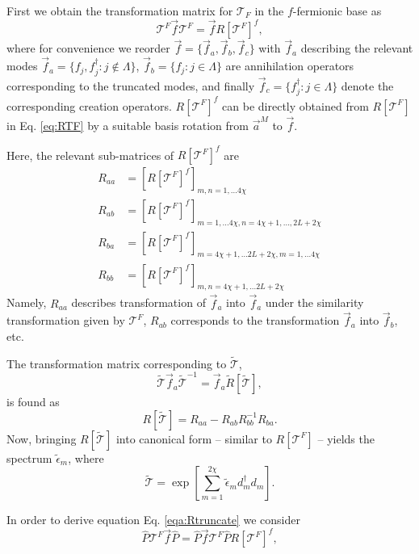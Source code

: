 \documentclass[prl,twocolumn,showpacs,floatfix,superscriptaddress,nofootinbib]{revtex4-1}
\newcommand{\Br}[1]{\left[#1\right]}
\begin{document}
First we obtain the transformation matrix for $\mathcal{T}_F$ in the $f$-fermionic base as
\begin{equation*}
\mathcal{T}^F \vec f \mathcal{T}^F = \vec f R[\mathcal{T}^F]^f,
\end{equation*} 
where for convenience we reorder  
$\vec f =\{\vec f_a, \vec f_b, \vec f_c \} $ with $\vec f_a$ describing the relevant modes $\vec f_a = \{f_j, f_j^\dagger : j \notin \Lambda \}$, $\vec f_b = \{f_j : j \in \Lambda\}$  are annihilation operators corresponding to the truncated modes, and finally  $\vec f_c = \{f_j^\dagger : j \in \Lambda\}$ denote the corresponding creation operators. $R[\mathcal{T}^F]^f$ can be directly obtained from $R[\mathcal{T}^F]$ in Eq. \eqref{eq:RTF} by a suitable basis rotation from $\vec a^M$ to $\vec f$. 

\noindent Here, the relevant sub-matrices of $R[\mathcal{T}^F]^f$ are 
\begin {align*}
R_{aa} &= \Br{R[\mathcal{T}^F]^f}_{m,n = 1,\dotsc 4 \chi} \\
R_{ab} &= \Br{R[\mathcal{T}^F]^f}_{m = 1,\dotsc 4 \chi, n = 4\chi +1, \dotsc, 2 L + 2 \chi } \\
R_{ba} &= \Br{R[\mathcal{T}^F]^f}_{m = 4\chi +1, \dotsc 2 L + 2 \chi, m = 1,\dotsc 4 \chi} \\
R_{bb} &= \Br{R[\mathcal{T}^F]^f}_{m,n = 4\chi +1, \dotsc 2 L+2 \chi} 
\end {align*}
Namely, $R_{aa}$ describes transformation of  $\vec f_a$  into  $\vec f_a$ under the similarity transformation given by $\mathcal{T}^F$,
 $R_{ab}$  corresponds to the transformation $\vec f_a$  into  $\vec f_b$, etc.
 
The transformation matrix corresponding to $\tilde {\mathcal{T}}$, 
\begin{equation}
\label{eq:tT}  
\tilde{ \mathcal{T}} \vec f_a \tilde{ \mathcal{T}}^{-1} = \vec  f_a \tilde R [\tilde{\mathcal {T}} ],
\end{equation}
is found as
\begin{equation}
\label{eqa:Rtruncate}  
R[\tilde{\mathcal{T}}] = R_{aa} - R_{ab} R_{bb}^{-1} R_{ba}. 
\end{equation}
Now, bringing $R[\tilde{\mathcal{T}}]$ into canonical form -- similar to $R[{\mathcal{T}^F}]$ -- yields the spectrum $\tilde \epsilon_m$, where
$$
\tilde {\mathcal{T}} = \exp \Br{\sum _{m=1}^{2\chi} \tilde \epsilon_m d_m^\dagger d_m }. 
$$

In order to derive equation Eq.  \eqref{eqa:Rtruncate} we consider 
\begin{equation}
\label{eq:PTP}
\hat P \mathcal{T}^F \vec f \hat P = \hat P \vec f \mathcal{T}^F \hat P R[\mathcal{T}^F]^f,
\end{equation}
\end{document}
